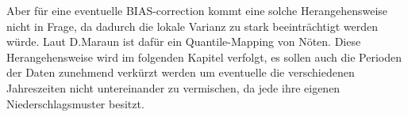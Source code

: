 Aber für eine eventuelle BIAS-correction kommt eine solche Herangehensweise nicht in Frage, da dadurch die lokale Varianz zu stark beeinträchtigt werden würde. Laut D.Maraun \cite{biasMaraun} ist dafür ein Quantile-Mapping von Nöten. Diese Herangehensweise wird im folgenden Kapitel verfolgt, es sollen auch die Perioden der Daten zunehmend verkürzt werden um eventuelle die verschiedenen Jahreszeiten nicht untereinander zu vermischen, da jede ihre eigenen Niederschlagsmuster besitzt.
